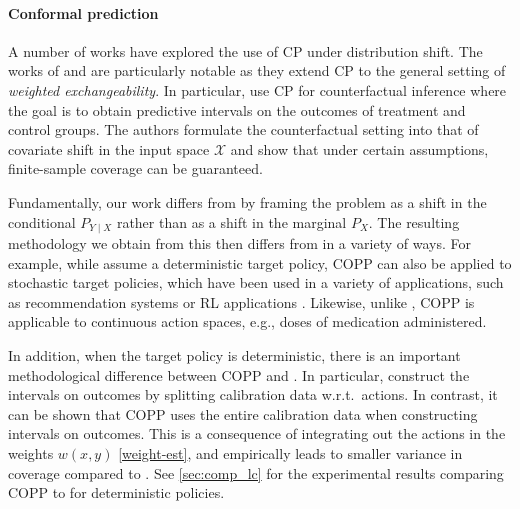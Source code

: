 \paragraph{Conformal prediction} A number of works have explored the use of CP under distribution shift. The works of \cite{tibshirani2020conformal} and \cite{lei2020conformal} are particularly notable as they extend CP to the general setting of \textit{weighted exchangeability}.  In particular, \cite{lei2020conformal} use CP for counterfactual inference where the goal is to obtain predictive intervals on the outcomes of treatment and control groups. The authors formulate the counterfactual setting into that of covariate shift in the input space $\mathcal{X}$ and show that under certain assumptions, finite-sample coverage can be guaranteed.

Fundamentally, our work differs from \cite{lei2020conformal} by framing the problem as a shift in the conditional $P_{Y\mid X}$ rather than as a shift in the marginal $P_X$.
The resulting methodology we obtain from this then differs from \cite{lei2020conformal} in a variety of ways.
For example, while \cite{lei2020conformal} assume a deterministic target policy, COPP can also be applied to stochastic target policies, which have been used in a variety of applications, such as recommendation systems or RL applications \citep{swaminathan2016off, su2020doubly, farajtabar2018more}. 
Likewise, unlike \cite{lei2020conformal}, COPP is applicable to continuous action spaces, e.g., doses of medication administered.

In addition, when the target policy is deterministic, there is an important methodological difference between COPP and \cite{lei2020conformal}.
In particular, \cite{lei2020conformal} construct the intervals on outcomes by splitting calibration data w.r.t.\ actions.
In contrast, it can be shown that COPP uses the entire calibration data when constructing intervals on outcomes.
This is a consequence of integrating out the actions in the weights $w(x, y)$ \eqref{weight-est}, and empirically leads to smaller variance in coverage compared to \cite{lei2020conformal}.
See \ref{sec:comp_lc} for the experimental results comparing COPP to \cite{lei2020conformal} for deterministic policies.


